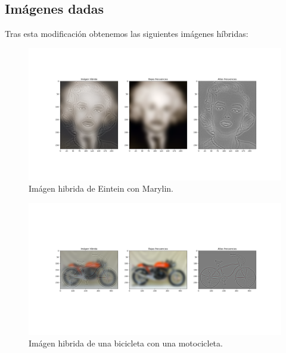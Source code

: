 \documentclass[12pt, spanish]{article}
\begin{document}
\subsection{Imágenes dadas}

Tras esta modificación obtenemos las siguientes imágenes híbridas:


\begin{figure}[H]
  \centering
      \includegraphics[width=\textwidth]{hibridas_color/E-M.png}
 		 \caption{Imágen hibrida de Eintein con Marylin.}
  		\label{fig:ej2al}

\end{figure}


\begin{figure}[H]
  \centering
      \includegraphics[width=\textwidth]{hibridas_color/B-M.png}
 		 \caption{Imágen hibrida de una bicicleta con una motocicleta.}
  		\label{fig:ej2al}

\end{figure}
\end{document}
